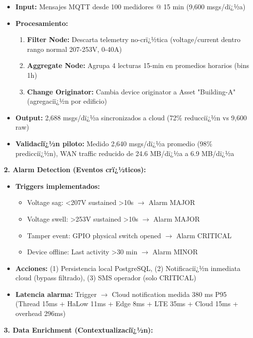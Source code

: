 \begin{itemize}
    \item \textbf{Input:} Mensajes MQTT desde 100 medidores @ 15 min (9,600 msgs/dï¿½a)
    \item \textbf{Procesamiento:}
    \begin{enumerate}
        \item \textbf{Filter Node:} Descarta telemetry no-crï¿½tica (voltage/current dentro rango normal 207-253V, 0-40A)
        \item \textbf{Aggregate Node:} Agrupa 4 lecturas 15-min en promedios horarios (bins 1h)
        \item \textbf{Change Originator:} Cambia device originator a Asset "Building-A" (agregaciï¿½n por edificio)
    \end{enumerate}
    \item \textbf{Output:} 2,688 msgs/dï¿½a sincronizados a cloud (72\% reducciï¿½n vs 9,600 raw)
    \item \textbf{Validaciï¿½n piloto:} Medido 2,640 msgs/dï¿½a promedio (98\% predicciï¿½n), WAN traffic reducido de 24.6 MB/dï¿½a a 6.9 MB/dï¿½a
\end{itemize}

\textbf{2. Alarm Detection (Eventos crï¿½ticos):}

\begin{itemize}
    \item \textbf{Triggers implementados:}
    \begin{itemize}
        \item Voltage sag: <207V sustained >10s $\rightarrow$ Alarm MAJOR
        \item Voltage swell: >253V sustained >10s $\rightarrow$ Alarm MAJOR  
        \item Tamper event: GPIO physical switch opened $\rightarrow$ Alarm CRITICAL
        \item Device offline: Last activity >30 min $\rightarrow$ Alarm MINOR
    \end{itemize}
    \item \textbf{Acciones:} (1) Persistencia local PostgreSQL, (2) Notificaciï¿½n inmediata cloud (bypass filtrado), (3) SMS operador (solo CRITICAL)
    \item \textbf{Latencia alarma:} Trigger $\rightarrow$ Cloud notification medida 380 ms P95 (Thread 15ms + HaLow 11ms + Edge 8ms + LTE 35ms + Cloud 15ms + overhead 296ms)
\end{itemize}

\textbf{3. Data Enrichment (Contextualizaciï¿½n):}

